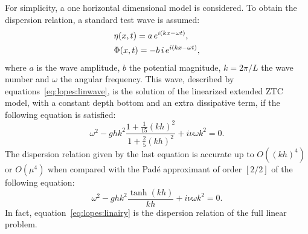 For simplicity, a one horizontal dimensional model is considered.  To
obtain the dispersion relation, a standard test wave is
assumed:
\begin{subequations}\label{eq:lopes:linwave}
\begin{align}
&\eta(x,t)=a\,e^{i(kx-\omega
  t)},\vspace{0.3cm}\\
&\Phi(x,t)=-b\,i\,e^{i(kx-\omega t)},
\end{align}
\end{subequations}
where $a$ is the wave amplitude, $b$ the potential
magnitude, $k=2\pi/L$ the wave number and $\omega$ the
angular frequency.  This wave, described by
equations~\eqref{eq:lopes:linwave}, is the solution of the
linearized extended ZTC model, with a constant depth bottom and an
extra dissipative term, if the following equation is
satisfied:
\begin{equation}\label{eq:lopes:dissdisp}
\omega^2-ghk^2\frac{1+\frac{1}{15}(kh)^2}{1+\frac{2}{5}(kh)^2}+i\nu\omega
k^2=0.
\end{equation}
The dispersion relation given by the last equation is
accurate up to $O((kh)^4)$ or $O(\mu^4)$ when compared with
the Pad\'{e} approximant of order $[2/2]$ of the following
equation:
\begin{equation}\label{eq:lopes:linairy}
\omega^2-ghk^2\frac{\tanh(kh)}{kh}+i\nu\omega k^2=0.
\end{equation}
In fact, equation~\eqref{eq:lopes:linairy} is the dispersion
relation of the full linear problem.

